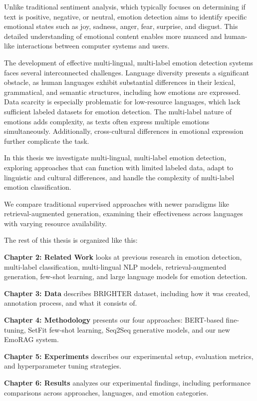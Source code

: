 \documentclass[a4paper,12pt]{extarticle}
\begin{document}
Unlike traditional sentiment analysis, which typically focuses on determining if text is positive, negative, or neutral, emotion detection aims to identify specific emotional states such as joy, sadness, anger, fear, surprise, and disgust. This detailed understanding of emotional content enables more nuanced and human-like interactions between computer systems and users.

The development of effective multi-lingual, multi-label emotion detection systems faces several interconnected challenges. Language diversity presents a significant obstacle, as human languages exhibit substantial differences in their lexical, grammatical, and semantic structures, including how emotions are expressed. Data scarcity is especially problematic for low-resource languages, which lack sufficient labeled datasets for emotion detection. The multi-label nature of emotions adds complexity, as texts often express multiple emotions simultaneously. 
Additionally, cross-cultural differences in emotional expression further complicate the task.

In this thesis we investigate multi-lingual, multi-label emotion detection, exploring approaches that can function with limited labeled data, adapt to linguistic and cultural differences, and handle the complexity of multi-label emotion classification. 

We compare traditional supervised approaches with newer paradigms like retrieval-augmented generation, examining their effectiveness across languages with varying resource availability.

The rest of this thesis is organized like this:

\textbf{Chapter 2: Related Work} looks at previous research in emotion detection, multi-label classification, multi-lingual NLP models, retrieval-augmented generation, few-shot learning, and large language models for emotion detection.

\textbf{Chapter 3: Data} describes BRIGHTER dataset, including how it was created, annotation process, and what it consists of.

\textbf{Chapter 4: Methodology} presents our four approaches: BERT-based fine-tuning, SetFit few-shot learning, Seq2Seq generative models, and our new EmoRAG system.

\textbf{Chapter 5: Experiments} describes our experimental setup, evaluation metrics, and hyperparameter tuning strategies.

\textbf{Chapter 6: Results} analyzes our experimental findings, including performance comparisons across approaches, languages, and emotion categories.
\end{document}
